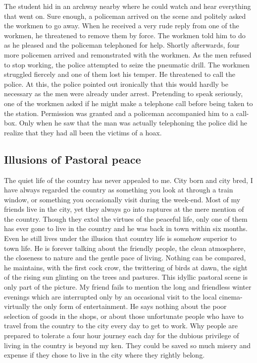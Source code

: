 \documentclass[11pt]{article}
\begin{document}
The student hid in an archway nearby where he could watch and hear everything that went on. Sure enough, a policeman arrived on the scene and politely asked the workmen to go away. When he received a very rude reply from one of the workmen, he threatened to remove them by force. The workmen told him to do as he pleased and the policeman telephoned for help. Shortly afterwards, four more policemen arrived and remonstrated with the workmen. As the men refused to stop working, the police attempted to seize the pneumatic drill. The workmen struggled fiercely and one of them lost his temper. He threatened to call the police. At this, the police pointed out ironically that this would hardly be necessary as the men were already under arrest. Pretending to speak seriously, one of the workmen asked if he might make a telephone call before being taken to the station. Permission was granted and a policeman accompanied him to a call-box. Only when he saw that the man was actually telephoning the police did he realize that they had all been the victims of a hoax. 
\subsection{Illusions of Pastoral peace}
\label{sec-1-41}

The quiet life of the country has never appealed to me. City born and city bred, I have always regarded the country as something you look at through a train window, or something you occasionally visit during the week-end. Most of my friends live in the city, yet they always go into raptures at the mere mention of the country. Though they extol the virtues of the peaceful life, only one of them has ever gone to live in the country and he was back in town within six months. Even he still lives under the illusion that country life is somehow superior to town life. He is forever talking about the friendly people, the clean atmosphere, the closeness to nature and the gentle pace of living. Nothing can be compared, he maintains, with the first cock crow, the twittering of birds at dawn, the sight of the rising sun glinting on the trees and pastures. This idyllic pastoral scene is only part of the picture. My friend fails to mention the long and friendless winter evenings which are interrupted only by an occasional visit to the local cinema-virtually the only form of entertainment. He says nothing about the poor selection of goods in the shops, or about those unfortunate people who have to travel from the country to the city every day to get to work. Why people are prepared to tolerate a four hour journey each day for the dubious privilege of living in the country is beyond my ken. They could be saved so much misery and expense if they chose to live in the city where they rightly belong. 
\end{document}
